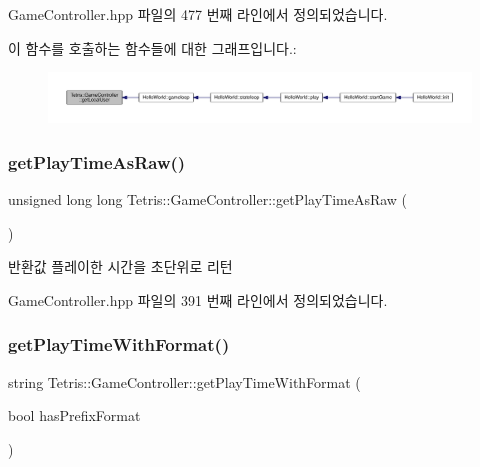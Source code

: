 Game\+Controller.\+hpp 파일의 477 번째 라인에서 정의되었습니다.

이 함수를 호출하는 함수들에 대한 그래프입니다.\+:
\nopagebreak
\begin{figure}[H]
\begin{center}
\leavevmode
\includegraphics[width=350pt]{class_tetris_1_1_game_controller_abc67d4b309ce2886b43a3b4e0af22abc_icgraph}
\end{center}
\end{figure}
\mbox{\label{class_tetris_1_1_game_controller_afce7f1fc500acedd99636b837f9bccf4}} 
\subsubsection{\texorpdfstring{get\+Play\+Time\+As\+Raw()}{getPlayTimeAsRaw()}}
{\footnotesize\ttfamily unsigned long long Tetris\+::\+Game\+Controller\+::get\+Play\+Time\+As\+Raw (\begin{DoxyParamCaption}{ }\end{DoxyParamCaption})\hspace{0.3cm}{\ttfamily [inline]}}

\begin{DoxyReturn}{반환값}
플레이한 시간을 초단위로 리턴 
\end{DoxyReturn}


Game\+Controller.\+hpp 파일의 391 번째 라인에서 정의되었습니다.

\mbox{\label{class_tetris_1_1_game_controller_a71765a7d8b76400832c98002a113ed26}} 
\subsubsection{\texorpdfstring{get\+Play\+Time\+With\+Format()}{getPlayTimeWithFormat()}}
{\footnotesize\ttfamily string Tetris\+::\+Game\+Controller\+::get\+Play\+Time\+With\+Format (\begin{DoxyParamCaption}\item[{bool}]{has\+Prefix\+Format }\end{DoxyParamCaption})\hspace{0.3cm}{\ttfamily [inline]}}

